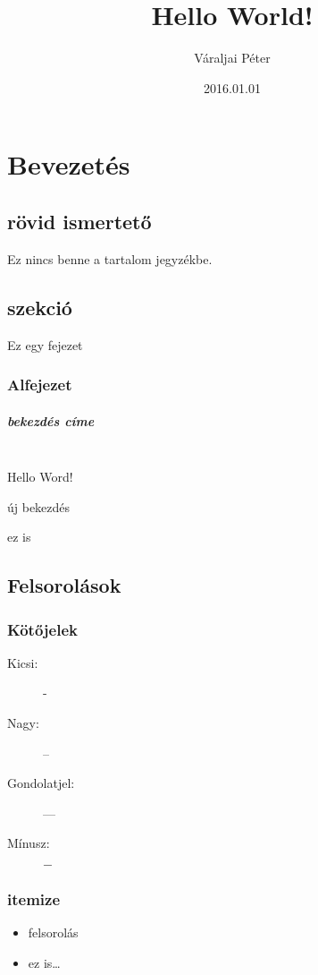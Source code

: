 \documentclass[a4papper, 12pt]{report}
\title{Hello World!}
\author{V\'{a}raljai P\'{e}ter}
\date{2016.01.01}
\begin{document}
	\maketitle
	
	\chapter{Bevezetés}
		\section*{rövid ismertető}
			Ez nincs benne a tartalom jegyzékbe.
		\section{szekció}
			Ez egy fejezet
			\subsection{Alfejezet}
				\paragraph{bekezdés címe}\mbox{} \\ %
				Hello Word!
				
				\noindent %
				új bekezdés
				
				ez is %
		\newpage		
		\section{Felsorolások}
			\subsection{Kötőjelek}
				\begin{description}
					\item[Kicsi:] -
					\item[Nagy:] --
					\item[Gondolatjel:] ---
					\item[Mínusz:] $-$
				\end{description}
			\subsection{itemize}
				\begin{itemize}
					\item felsorolás
					\item ez is\dots
				\end{itemize}
\end{document}
